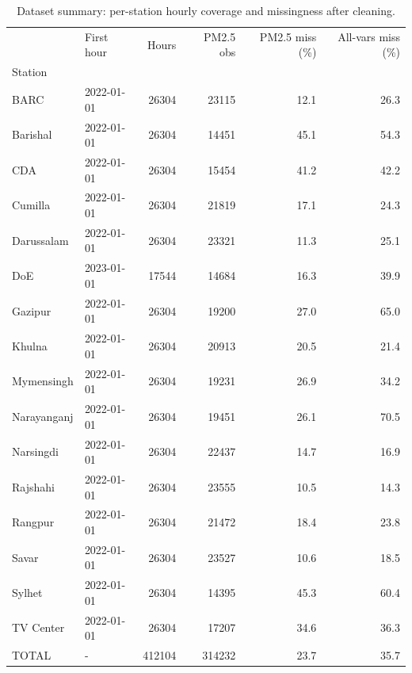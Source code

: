\begin{table}
\caption{Dataset summary: per-station hourly coverage and missingness after cleaning.}
\label{tab:dataset}
\begin{tabular}{llrrrr}
\toprule
 & First hour & Hours & PM2.5 obs & PM2.5 miss (\%) & All-vars miss (\%) \\
Station &  &  &  &  &  \\
\midrule
BARC & 2022-01-01 & 26304 & 23115 & 12.1 & 26.3 \\
Barishal & 2022-01-01 & 26304 & 14451 & 45.1 & 54.3 \\
CDA & 2022-01-01 & 26304 & 15454 & 41.2 & 42.2 \\
Cumilla & 2022-01-01 & 26304 & 21819 & 17.1 & 24.3 \\
Darussalam & 2022-01-01 & 26304 & 23321 & 11.3 & 25.1 \\
DoE & 2023-01-01 & 17544 & 14684 & 16.3 & 39.9 \\
Gazipur & 2022-01-01 & 26304 & 19200 & 27.0 & 65.0 \\
Khulna & 2022-01-01 & 26304 & 20913 & 20.5 & 21.4 \\
Mymensingh & 2022-01-01 & 26304 & 19231 & 26.9 & 34.2 \\
Narayanganj & 2022-01-01 & 26304 & 19451 & 26.1 & 70.5 \\
Narsingdi & 2022-01-01 & 26304 & 22437 & 14.7 & 16.9 \\
Rajshahi & 2022-01-01 & 26304 & 23555 & 10.5 & 14.3 \\
Rangpur & 2022-01-01 & 26304 & 21472 & 18.4 & 23.8 \\
Savar & 2022-01-01 & 26304 & 23527 & 10.6 & 18.5 \\
Sylhet & 2022-01-01 & 26304 & 14395 & 45.3 & 60.4 \\
TV Center & 2022-01-01 & 26304 & 17207 & 34.6 & 36.3 \\
TOTAL & - & 412104 & 314232 & 23.7 & 35.7 \\
\bottomrule
\end{tabular}
\end{table}
